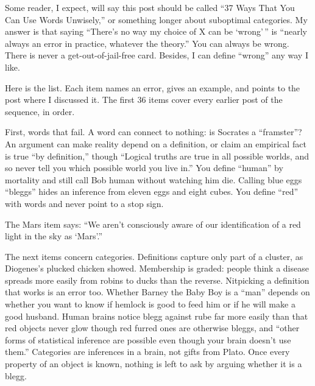 
Some reader, I expect, will say this post should be called ``37 Ways That You Can Use Words Unwisely,'' or something longer about suboptimal categories. My answer is that saying ``There's no way my choice of X can be `wrong'\,'' is ``nearly always an error in practice, whatever the theory.'' You can always be wrong. There is never a get-out-of-jail-free card. Besides, I can define ``wrong'' any way I like.

Here is the list. Each item names an error, gives an example, and points to the post where I discussed it. The first 36 items cover every earlier post of the sequence, in order. 

First, words that fail. A word can connect to nothing: is Socrates a ``framster''? An argument can make reality depend on a definition, or claim an empirical fact is true ``by definition,'' though ``Logical truths are true in all possible worlds, and so never tell you which possible world you live in.'' You define ``human'' by mortality and still call Bob human without watching him die. Calling blue eggs ``bleggs'' hides an inference from eleven eggs and eight cubes. You define ``red'' with words and never point to a stop sign.

The Mars item says: ``We aren't consciously aware of our identification of a red light in the sky as `Mars'.'' 

The next items concern categories. Definitions capture only part of a cluster, as Diogenes's plucked chicken showed. Membership is graded: people think a disease spreads more easily from robins to ducks than the reverse. Nitpicking a definition that works is an error too. Whether Barney the Baby Boy is a ``man'' depends on whether you want to know if hemlock is good to feed him or if he will make a good husband. Human brains notice blegg against rube far more easily than that red objects never glow though red furred ones are otherwise bleggs, and ``other forms of statistical inference are possible even though your brain doesn't use them.''  Categories are inferences in a brain, not gifts from Plato. Once every property of an object is known, nothing is left to ask by arguing whether it is a blegg.

